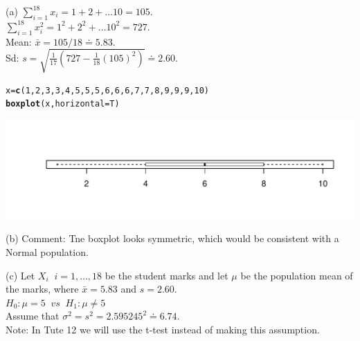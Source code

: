 \documentclass[bigtut]{tutorial}\usepackage[]{graphicx}\usepackage[]{color}
\makeatletter
\def\maxwidth{ %
  \ifdim\Gin@nat@width>\linewidth
    \linewidth
  \else
    \Gin@nat@width
  \fi
}
\newcommand{\hlnum}[1]{\textcolor[rgb]{0.686,0.059,0.569}{#1}}%
\newcommand{\hlstd}[1]{\textcolor[rgb]{0.345,0.345,0.345}{#1}}%
\newcommand{\hlkwb}[1]{\textcolor[rgb]{0.69,0.353,0.396}{#1}}%
\newcommand{\hlkwc}[1]{\textcolor[rgb]{0.333,0.667,0.333}{#1}}%
\newcommand{\hlkwd}[1]{\textcolor[rgb]{0.737,0.353,0.396}{\textbf{#1}}}%
\newenvironment{kframe}{%
 \def\at@end@of@kframe{}%
 \ifinner\ifhmode%
  \def\at@end@of@kframe{\end{minipage}}%
  \begin{minipage}{\columnwidth}%
 \fi\fi%
 \def\FrameCommand##1{\hskip\@totalleftmargin \hskip-\fboxsep
 \colorbox{shadecolor}{##1}\hskip-\fboxsep
     \hskip-\linewidth \hskip-\@totalleftmargin \hskip\columnwidth}%
 \MakeFramed {\advance\hsize-\width
   \@totalleftmargin\z@ \linewidth\hsize
   \@setminipage}}%
 {\par\unskip\endMakeFramed%
 \at@end@of@kframe}
\newenvironment{knitrout}{}{} %
\makeatother
\begin{document}
\begin{tutorial}
\begin{questions}
\begin{solution}
(a)
$\sum_{i=1}^{18} x_{i} =1+ 2+ \ldots 10 = 105$. \\
$\sum_{i=1}^{18} x_{i}^2 =1^2+ 2^2+ \ldots 10^2 = 727$. \\
Mean: $\bar{x} = 105/18 \doteq 5.83$. \\
Sd:  $s = \sqrt{ \frac{1}{17} ( 727 - \frac{1}{18}(105)^2 ) } \doteq 2.60$. \\

\begin{knitrout}
\color{fgcolor}\begin{kframe}
\begin{alltt}
\hlstd{x}\hlkwb{=}\hlkwd{c}\hlstd{(}\hlnum{1}\hlstd{,}\hlnum{2}\hlstd{,}\hlnum{3}\hlstd{,}\hlnum{3}\hlstd{,}\hlnum{4}\hlstd{,}\hlnum{5}\hlstd{,}\hlnum{5}\hlstd{,}\hlnum{5}\hlstd{,}\hlnum{6}\hlstd{,}\hlnum{6}\hlstd{,}\hlnum{6}\hlstd{,}\hlnum{7}\hlstd{,}\hlnum{7}\hlstd{,}\hlnum{8}\hlstd{,}\hlnum{9}\hlstd{,}\hlnum{9}\hlstd{,}\hlnum{9}\hlstd{,}\hlnum{10}\hlstd{)}
\hlkwd{boxplot}\hlstd{(x,} \hlkwc{horizontal}\hlstd{=T)}
\end{alltt}
\end{kframe}
\includegraphics[width=\maxwidth]{figure/unnamed-chunk-12-1} 

\end{knitrout}


\vspace{.5cm}
(b)
Comment: Tne boxplot looks symmetric, which would be consistent with a Normal population.


(c)
Let $X_{i} \;\; i=1,\ldots,18$ be the student marks and let $\mu$ be the population mean of the marks, where $\bar{x}=5.83$ and $s=2.60$. \\

$H_0: \mu=5  \;\; vs \;\; H_1: \mu \neq 5$ \\

Assume that $\sigma^2 = s^2 = 2.595245^2 \doteq 6.74$. \\
Note: In Tute 12 we will use the t-test instead of making this assumption. \\


\end{solution}
\end{questions}
\end{tutorial}
\end{document}
